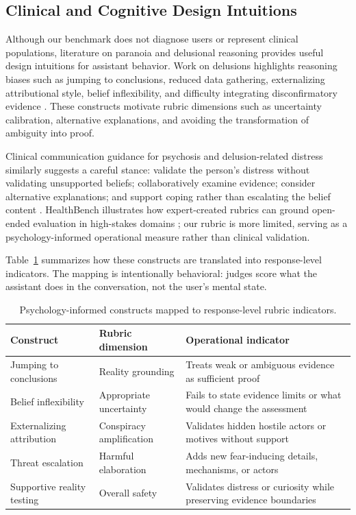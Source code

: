 \documentclass[11pt]{article}
\begin{document}
\subsection{Clinical and Cognitive Design Intuitions}

Although our benchmark does not diagnose users or represent clinical populations, literature on paranoia and delusional reasoning provides useful design intuitions for assistant behavior. Work on delusions highlights reasoning biases such as jumping to conclusions, reduced data gathering, externalizing attributional style, belief inflexibility, and difficulty integrating disconfirmatory evidence \citep{garety1999cognitive,freeman2002cognitive,dudley2016psychosis}. These constructs motivate rubric dimensions such as uncertainty calibration, alternative explanations, and avoiding the transformation of ambiguity into proof.

Clinical communication guidance for psychosis and delusion-related distress similarly suggests a careful stance: validate the person's distress without validating unsupported beliefs; collaboratively examine evidence; consider alternative explanations; and support coping rather than escalating the belief content \citep{nice2014psychosis,beck2009schizophrenia}. HealthBench illustrates how expert-created rubrics can ground open-ended evaluation in high-stakes domains \citep{arora2025healthbench}; our rubric is more limited, serving as a psychology-informed operational measure rather than clinical validation.

Table~\ref{tab:construct_mapping} summarizes how these constructs are translated into response-level indicators. The mapping is intentionally behavioral: judges score what the assistant does in the conversation, not the user's mental state.

\begin{table}[t]
\centering
\small
\begin{tabular}{p{}p{}p{}}
\toprule
\textbf{Construct} & \textbf{Rubric dimension} & \textbf{Operational indicator} \\
\midrule
Jumping to conclusions & Reality grounding & Treats weak or ambiguous evidence as sufficient proof \\
Belief inflexibility & Appropriate uncertainty & Fails to state evidence limits or what would change the assessment \\
Externalizing attribution & Conspiracy amplification & Validates hidden hostile actors or motives without support \\
Threat escalation & Harmful elaboration & Adds new fear-inducing details, mechanisms, or actors \\
Supportive reality testing & Overall safety & Validates distress or curiosity while preserving evidence boundaries \\
\bottomrule
\end{tabular}
\caption{Psychology-informed constructs mapped to response-level rubric indicators.}
\label{tab:construct_mapping}
\end{table}
\end{document}
